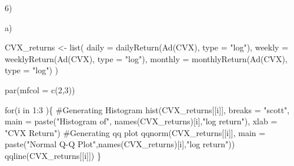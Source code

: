 \documentclass[
  letterpaper,
  DIV=11,
  numbers=noendperiod]{scrartcl}
\newenvironment{Shaded}{\begin{snugshade}}{\end{snugshade}}
\newcommand{\AttributeTok}[1]{\textcolor[rgb]{0.40,0.45,0.13}{#1}}
\newcommand{\CommentTok}[1]{\textcolor[rgb]{0.37,0.37,0.37}{#1}}
\newcommand{\ControlFlowTok}[1]{\textcolor[rgb]{0.00,0.23,0.31}{#1}}
\newcommand{\DecValTok}[1]{\textcolor[rgb]{0.68,0.00,0.00}{#1}}
\newcommand{\FunctionTok}[1]{\textcolor[rgb]{0.28,0.35,0.67}{#1}}
\newcommand{\NormalTok}[1]{\textcolor[rgb]{0.00,0.23,0.31}{#1}}
\newcommand{\OtherTok}[1]{\textcolor[rgb]{0.00,0.23,0.31}{#1}}
\newcommand{\SpecialCharTok}[1]{\textcolor[rgb]{0.37,0.37,0.37}{#1}}
\newcommand{\StringTok}[1]{\textcolor[rgb]{0.13,0.47,0.30}{#1}}
\begin{document}
6)

a)

\begin{Shaded}
\begin{Highlighting}[]
\NormalTok{CVX\_returns }\OtherTok{\textless{}{-}} \FunctionTok{list}\NormalTok{(}
  \AttributeTok{daily =} \FunctionTok{dailyReturn}\NormalTok{(}\FunctionTok{Ad}\NormalTok{(CVX), }\AttributeTok{type =} \StringTok{"log"}\NormalTok{),}
  \AttributeTok{weekly =} \FunctionTok{weeklyReturn}\NormalTok{(}\FunctionTok{Ad}\NormalTok{(CVX), }\AttributeTok{type =} \StringTok{"log"}\NormalTok{),}
  \AttributeTok{monthly =} \FunctionTok{monthlyReturn}\NormalTok{(}\FunctionTok{Ad}\NormalTok{(CVX), }\AttributeTok{type =} \StringTok{"log"}\NormalTok{)}
\NormalTok{)}

\FunctionTok{par}\NormalTok{(}\AttributeTok{mfcol =} \FunctionTok{c}\NormalTok{(}\DecValTok{2}\NormalTok{,}\DecValTok{3}\NormalTok{))}

\ControlFlowTok{for}\NormalTok{(i }\ControlFlowTok{in}  \DecValTok{1}\SpecialCharTok{:}\DecValTok{3}\NormalTok{ )\{}
  \CommentTok{\#Generating Histogram}
  \FunctionTok{hist}\NormalTok{(CVX\_returns[[i]], }\AttributeTok{breaks =} \StringTok{"scott"}\NormalTok{, }
       \AttributeTok{main =} \FunctionTok{paste}\NormalTok{(}\StringTok{"Histogram of"}\NormalTok{, }\FunctionTok{names}\NormalTok{(CVX\_returns)[i],}\StringTok{"log return"}\NormalTok{),}
       \AttributeTok{xlab =} \StringTok{"CVX Return"}\NormalTok{)}
  \CommentTok{\#Generating qq plot}
  \FunctionTok{qqnorm}\NormalTok{(CVX\_returns[[i]],}
         \AttributeTok{main =} \FunctionTok{paste}\NormalTok{(}\StringTok{"Normal Q{-}Q Plot"}\NormalTok{,}\FunctionTok{names}\NormalTok{(CVX\_returns)[i],}\StringTok{"log return"}\NormalTok{))}
  \FunctionTok{qqline}\NormalTok{(CVX\_returns[[i]])}
\NormalTok{\}}
\end{Highlighting}
\end{Shaded}
\end{document}
